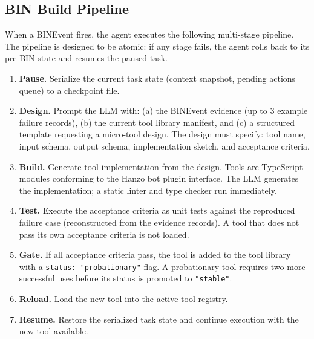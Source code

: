 \documentclass[11pt]{article}
\begin{document}
\subsection{BIN Build Pipeline}

When a BINEvent fires, the agent executes the following multi-stage pipeline.
The pipeline is designed to be atomic: if any stage fails, the agent rolls back
to its pre-BIN state and resumes the paused task.

\begin{enumerate}[leftmargin=1.5em]
    \item \textbf{Pause.} Serialize the current task state (context snapshot,
          pending actions queue) to a checkpoint file.

    \item \textbf{Design.} Prompt the LLM with: (a) the BINEvent evidence
          (up to 3 example failure records), (b) the current tool library
          manifest, and (c) a structured template requesting a micro-tool
          design. The design must specify: tool name, input schema, output
          schema, implementation sketch, and acceptance criteria.

    \item \textbf{Build.} Generate tool implementation from the design. Tools
          are TypeScript modules conforming to the Hanzo bot plugin interface.
          The LLM generates the implementation; a static linter and type
          checker run immediately.

    \item \textbf{Test.} Execute the acceptance criteria as unit tests against
          the reproduced failure case (reconstructed from the evidence records).
          A tool that does not pass its own acceptance criteria is not loaded.

    \item \textbf{Gate.} If all acceptance criteria pass, the tool is added to
          the tool library with a \texttt{status: "probationary"} flag. A
          probationary tool requires two more successful uses before its status
          is promoted to \texttt{"stable"}.

    \item \textbf{Reload.} Load the new tool into the active tool registry.

    \item \textbf{Resume.} Restore the serialized task state and continue
          execution with the new tool available.
\end{enumerate}
\end{document}

